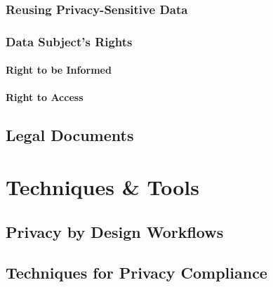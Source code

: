 \documentclass[
]{book}
\begin{document}
\hypertarget{reusing-privacy-sensitive-data}{%
\section{Reusing Privacy-Sensitive Data}\label{reusing-privacy-sensitive-data}}

\hypertarget{data-subjects-rights}{%
\section{Data Subject's Rights}\label{data-subjects-rights}}

\hypertarget{right-to-be-informed}{%
\subsection{Right to be Informed}\label{right-to-be-informed}}

\hypertarget{right-to-access}{%
\subsection{Right to Access}\label{right-to-access}}

\hypertarget{legal-documents}{%
\chapter*{Legal Documents}\label{legal-documents}}

\hypertarget{part-techniques-tools}{%
\part{Techniques \& Tools}\label{part-techniques-tools}}

\hypertarget{privacy-by-design-workflows}{%
\chapter*{Privacy by Design Workflows}\label{privacy-by-design-workflows}}

\hypertarget{techniques-for-privacy-compliance}{%
\chapter*{Techniques for Privacy Compliance}\label{techniques-for-privacy-compliance}}
\end{document}
